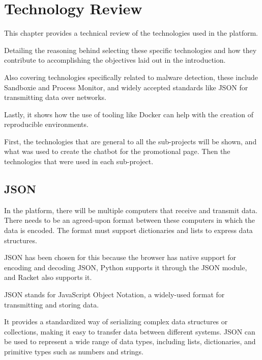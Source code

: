 \chapter{Technology Review}

This chapter provides a technical review of the technologies used in the platform.

Detailing the reasoning behind selecting these specific technologies
and how they contribute to accomplishing the objectives laid out in the introduction.

Also covering technologies specifically related to malware detection,
these include Sandboxie and Process Monitor,
and widely accepted standards like JSON for transmitting data over networks.

Lastly, it shows how the use of tooling like Docker
can help with the creation of reproducible environments.

First, the technologies that are general to all the sub-projects will be shown,
and what was used to create the chatbot for the promotional page.
Then the technologies that were used in each sub-project.

\section{JSON}
In the platform, there will be multiple computers that receive and transmit data.
There needs to be an agreed-upon format between these
computers in which the data is encoded.
The format must support dictionaries and lists to express data structures.

JSON has been chosen for this because the browser has
native support for encoding and decoding JSON,
Python supports it through the JSON module, and Racket also supports it.

JSON stands for JavaScript Object Notation,
a widely-used format for transmitting and storing data.

It provides a standardized way of serializing complex data structures or collections,
making it easy to transfer data between different systems.
JSON can be used to represent a wide range of data types,
including lists, dictionaries, and primitive types such as numbers and strings. \cite{ECMA-404}

